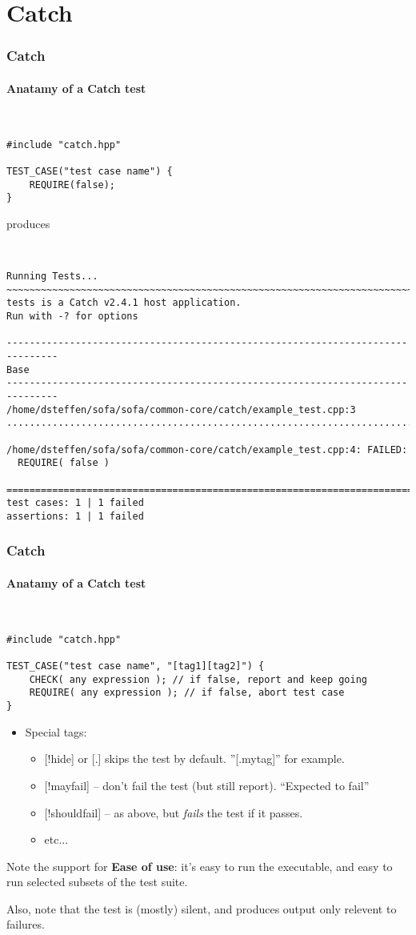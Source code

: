 \section{Catch}


\begin{frame}[fragile,t]
\frametitle{Catch}
\framesubtitle{Anatamy of a Catch test}
{\scriptsize\
\begin{verbatim}
#include "catch.hpp"

TEST_CASE("test case name") {
    REQUIRE(false);
}
\end{verbatim}}
produces
{\scriptsize\
\begin{verbatim}
Running Tests...
~~~~~~~~~~~~~~~~~~~~~~~~~~~~~~~~~~~~~~~~~~~~~~~~~~~~~~~~~~~~~~~~~~~~~~~~~~~~~~~
tests is a Catch v2.4.1 host application.
Run with -? for options

-------------------------------------------------------------------------------
Base
-------------------------------------------------------------------------------
/home/dsteffen/sofa/sofa/common-core/catch/example_test.cpp:3
...............................................................................

/home/dsteffen/sofa/sofa/common-core/catch/example_test.cpp:4: FAILED:
  REQUIRE( false )

===============================================================================
test cases: 1 | 1 failed
assertions: 1 | 1 failed
\end{verbatim}}
\end{frame}




\begin{frame}[fragile,t]
\frametitle{Catch}
\framesubtitle{Anatamy of a Catch test}
{\scriptsize\
\begin{verbatim}
#include "catch.hpp"

TEST_CASE("test case name", "[tag1][tag2]") {
    CHECK( any expression ); // if false, report and keep going
    REQUIRE( any expression ); // if false, abort test case
}
\end{verbatim}}

\begin{itemize}
  \item Special tags: 
    \begin{itemize}
      \item {[!hide]} or [.] skips the test by default. ''[.mytag]'' for
        example.
      \item {[!mayfail]} -- don't fail the test (but still report). ``Expected to fail''
      \item {[!shouldfail]} -- as above, but \emph{fails} the test if it passes.
      \item etc...
    \end{itemize}
\end{itemize}

Note the support for {\bf Ease of use}: it's easy to run the
executable, and easy to run selected subsets of the test suite.

Also, note that the test is (mostly) silent, and produces output only
relevent to failures.

\end{frame}


